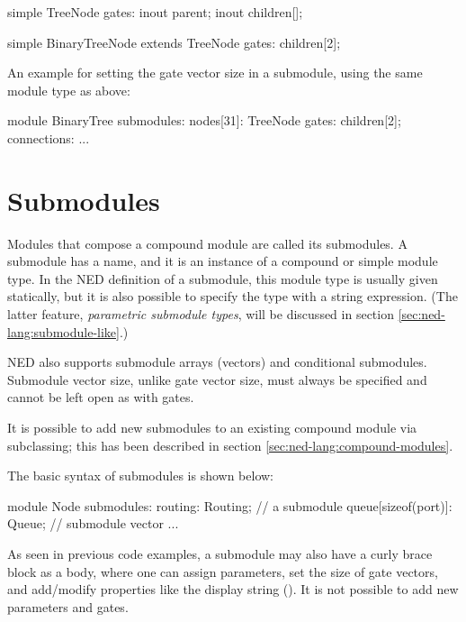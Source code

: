 \begin{ned}
simple TreeNode {
    gates:
        inout parent;
        inout children[];
}

simple BinaryTreeNode extends TreeNode {
    gates:
        children[2];
}
\end{ned}

An example for setting the gate vector size in a submodule, using the same
 module type as above:

\begin{ned}
module BinaryTree {
    submodules:
        nodes[31]: TreeNode {
            gates:
                children[2];
        }
    connections:
        ...
}
\end{ned}



\section{Submodules}
\label{sec:ned-lang:submodules}

Modules that compose a compound module are called its submodules.
A submodule has a name, and it is an instance of a compound or simple
module type. In the NED definition of a submodule, this module type
is usually given statically, but it is also possible to specify the type
with a string expression. (The latter feature, \textit{parametric submodule
types}, will be discussed in section \ref{sec:ned-lang:submodule-like}.)

NED also supports submodule arrays (vectors) and conditional submodules.
Submodule vector size, unlike gate vector size, must always be specified
and cannot be left open as with gates.

It is possible to add new submodules to an existing compound module via
subclassing; this has been described in section
\ref{sec:ned-lang:compound-modules}.

The basic syntax of submodules is shown below:

\begin{ned}
module Node
{
    submodules:
        routing: Routing;   // a submodule
        queue[sizeof(port)]: Queue;  // submodule vector
        ...
}
\end{ned}

As seen in previous code examples, a submodule may also have a
curly brace block as a body, where one can assign parameters, set the size of
gate vectors, and add/modify properties like the display string
(). It is not possible to add new parameters and gates.

